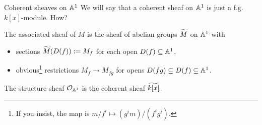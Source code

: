\documentclass[
  xcolor=dvipsnames,
  aspectratio=169,
  compress
]{beamer}
\begin{document}
\begin{frame}{Coherent sheaves on $\mathbb{A}^{{1}}$}
  We will say that a \alert{coherent sheaf} on $\mathbb{A}^{{1}}$ is just a f.g. $k[x]$-module. How?

  \pause

  \begin{definition}
    The \alert{associated sheaf} of $M$ is the sheaf of abelian groups $\assmod{M}$ on $\mathbb{A}^{{1}}$ with
    \begin{itemize}
      \item
        sections $\widetilde{{M}}(D(f)) := M_f$ for each open $D(f) \subseteq \mathbb{A}^{{1}}$,

      \item
        obvious\footnote{If you insist, the map is $m/f^i \mapsto (g^i m)/(f^i g^i)$.} restrictions $M_f \to M_{fg}$ for opens $D(fg) \subseteq D(f) \subseteq \mathbb{A}^{{1}}$.
    \end{itemize}
  \end{definition}

  \begin{example}
    The structure sheaf $\strshf{\aff{1}}$ is the coherent sheaf $\assmod{k[x]}$.
  \end{example}
\end{frame}

\iffalse
\begin{frame}{Examples}
  \begin{example}
    The structure sheaf $\strshf{\aff{1}}$ is the coherent sheaf $\assmod{k[x]}$.
  \end{example}

  \pause

  \begin{example}
    Let $M = \quot{k[x]}{\gen{x - a}} \cong k$.
    \begin{itemize}
      \item
        If $a \in D(f)$, then $f(a) \neq 0$.
        Then $f$ already acts invertibly on $M$, so localising shouldn't do anything.
        We get $\assmod{M}(D(f)) \cong k$.

        \pause

      \item
        If $a \not\in D(f)$, then $f(a) = 0$.
        Thus $f = 0$ in $M$.
        On the other hand, localising $M$ at $f$ makes $f$ invertible too.
        This can only be true if $\assmod{M}(D(f)) = 0$.
    \end{itemize}

    \pause
    As the sections of $\assmod{M}$ are \alert{supported} only at the point $a$, we call it a \alert{skyscraper sheaf}.
  \end{example}
\end{frame}
\fi
\end{document}

